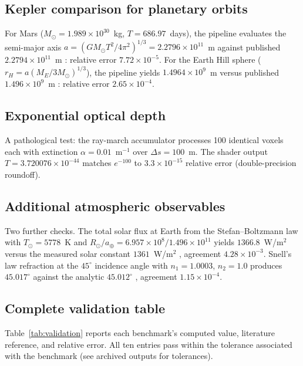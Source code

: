 \documentclass[11pt,twocolumn,a4paper]{article}
\theoremstyle{definition}
\theoremstyle{remark}
\begin{document}
\subsection{Kepler comparison for planetary orbits}

For Mars ($M_\odot = 1.989 \times 10^{30}$~kg, $T = 686.97$~days), the pipeline evaluates the semi-major axis $a = (GM_\odot T^2/4\pi^2)^{1/3} = 2.2796\times 10^{11}$~m against published $2.2794\times 10^{11}$~m \citep{standish2008}: relative error $7.72\times 10^{-5}$. For the Earth Hill sphere ($r_H = a(M_E/3M_\odot)^{1/3}$), the pipeline yields $1.4964\times 10^{9}$~m versus published $1.496\times 10^{9}$~m \citep{murray2000}: relative error $2.65\times 10^{-4}$.

\subsection{Exponential optical depth}

A pathological test: the ray-march accumulator processes 100 identical voxels each with extinction $\alpha = 0.01$~m$^{-1}$ over $\Delta s = 100$~m. The shader output $T = 3.720076 \times 10^{-44}$ matches $e^{-100}$ to $3.3\times 10^{-15}$ relative error (double-precision roundoff).

\subsection{Additional atmospheric observables}

Two further checks. The total solar flux at Earth from the Stefan--Boltzmann law with $T_\odot = 5778$~K and $R_\odot/a_\oplus = 6.957\times 10^{8}/1.496\times 10^{11}$ yields $1366.8$~W/m$^2$ versus the measured solar constant $1361$~W/m$^2$ \citep{rybicki1979}, agreement $4.28\times 10^{-3}$. Snell's law refraction at the $45^\circ$ incidence angle with $n_1 = 1.0003$, $n_2 = 1.0$ produces $45.017^\circ$ against the analytic $45.012^\circ$ \citep{born1999}, agreement $1.15\times 10^{-4}$.

\subsection{Complete validation table}

Table~\ref{tab:validation} reports each benchmark's computed value, literature reference, and relative error. All ten entries pass within the tolerance associated with the benchmark (see archived outputs for tolerances).
\end{document}
